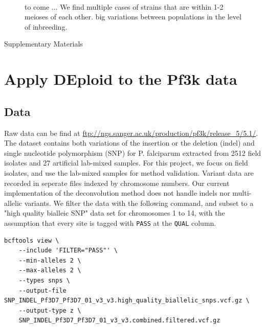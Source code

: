 \documentclass{article}
\begin{document}
\begin{figure}[h]
\centering
{}\\

\caption{to come ... We find multiple cases of strains that are within 1-2 meioses of each other. big variations between populations in the level of inbreeding. }

\end{figure}





\newpage

\begin{center}
\LARGE
Supplementary Materials
\end{center}



\section{Apply DEploid to the Pf3k data}
\subsection{Data}
Raw data can be find at \url{ftp://ngs.sanger.ac.uk/production/pf3k/release_5/5.1/}. The dataset contains both variations of the insertion or the deletion (indel) and single nucleotide polymorphism (SNP) for {P. falciparum} extracted from 2512 field isolates and 27 artificial lab-mixed samples. For this project, we focus on field isolates, and use the lab-mixed samples for method validation. Variant data are recorded in seperate files indexed by chromosome numbers. Our current implementation of the deconvolution method \citep{Zhu2017} does not handle indels nor multi-allelic variants. We filter the data with the following command, and subset to a "high quality bialleic SNP" data set for chromosomes 1 to 14, with the assumption that every site is tagged with {\tt PASS} at the {\tt QUAL} column.
\linespread{1}
\begin{lstlisting}
bcftools view \
    --include 'FILTER="PASS"' \
    --min-alleles 2 \
    --max-alleles 2 \
    --types snps \
    --output-file SNP_INDEL_Pf3D7_Pf3D7_01_v3_v3.high_quality_biallelic_snps.vcf.gz \
    --output-type z \
    SNP_INDEL_Pf3D7_Pf3D7_01_v3_v3.combined.filtered.vcf.gz
\end{lstlisting}
\linespread{1.5}
\end{document}
